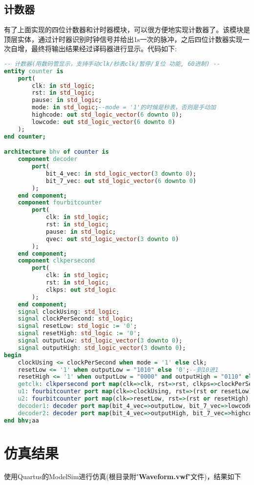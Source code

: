 \documentclass[UTF8, onecolumn, a4paper]{article}
\begin{document}
\subsection{计数器}
有了上面实现的四位计数器和计时器模块，可以很方便地实现计数器了。该模块是顶层实体，通过计时器识别时钟信号并给出1s一次的脉冲，之后四位计数器实现一次自增，最终将输出结果经过译码器进行显示。代码如下:
\begin{lstlisting}[language={VHDL}, title={counter.vhd}]
-- 计数器(用数码管显示，支持手动clk/秒表clk/暂停/复位 功能, 60进制) --
entity counter is
	port(
		clk: in std_logic;
		rst: in std_logic;
		pause: in std_logic;
		mode: in std_logic;--mode = '1'的时候是秒表，否则是手动加
		highcode: out std_logic_vector(6 downto 0);
		lowcode: out std_logic_vector(6 downto 0)
	);
end counter;

architecture bhv of counter is
	component decoder
		port(
			bit_4_vec: in std_logic_vector(3 downto 0);
			bit_7_vec: out std_logic_vector(6 downto 0)
		);
	end component;
	component fourbitcounter
		port(
			clk: in std_logic;
			rst: in std_logic;
			pause: in std_logic;
			qvec: out std_logic_vector(3 downto 0)
		);
	end component;
	component clkpersecond
		port(
			clk: in std_logic;
			rst: in std_logic;
			clkps: out std_logic
		);
	end component;
	signal clockUsing: std_logic;
	signal clockPerSecond: std_logic;
	signal resetLow: std_logic := '0';
	signal resetHigh: std_logic := '0';
	signal outputLow: std_logic_vector(3 downto 0);
	signal outputHigh: std_logic_vector(3 downto 0);
begin
	clockUsing <= clockPerSecond when mode = '1' else clk;
	resetLow <= '1' when outputLow = "1010" else '0';--到10进1   
	resetHigh <= '1' when outputLow = "0000" and outputHigh = "0110" else '0';--到60归零
	getclk: clkpersecond port map(clk=>clk, rst=>rst, clkps=>clockPerSecond);
	u1: fourbitcounter port map(clk=>clockUsing, rst=>(rst or resetLow), pause=>pause, qvec=>outputLow );
	u2: fourbitcounter port map(clk=>resetLow, rst=>(rst or resetHigh), pause=>pause, qvec=>outputHigh );
	decoder1: decoder port map(bit_4_vec=>outputLow, bit_7_vec=>lowcode);
	decoder2: decoder port map(bit_4_vec=>outputHigh, bit_7_vec=>highcode);
end bhv;aa
\end{lstlisting}

\section{仿真结果}
使用Quartus的ModelSim进行仿真(根目录附"\textbf{Waveform.vwf}"文件)，结果如下
\begin{figure}[htb]
	\centering
\end{figure}
\end{document}
